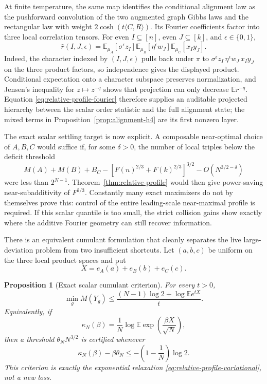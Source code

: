\documentclass[11pt]{article}
\newtheorem{proposition}[theorem]{Proposition}
\newcommand{\E}{\mathbb E}
\begin{document}
At finite temperature, the same map identifies the conditional alignment
law as the pushforward convolution of the two augmented graph Gibbs laws and
the rectangular law with weight $2\cosh(t\langle C,R\rangle)$.  Its Fourier
coefficients factor into three local correlation tensors.  For even
$I\subseteq[n]$, even $J\subseteq[k]$, and $\epsilon\in\{0,1\}$,
\begin{equation}
 \widehat r(I,J,\epsilon)
 =\E_{\mu_A}[\sigma^\epsilon z_I]
  \E_{\mu_B}[\eta^\epsilon w_J]
 \E_{\mu_C}[x_Iy_J].
 \label{eq:relative-profile-fourier}
\end{equation}
Indeed, the character indexed by $(I,J,\epsilon)$ pulls back under $\pi$ to
$\sigma^\epsilon z_I\,\eta^\epsilon w_J\,x_Iy_J$ on the three product
factors, so independence gives the displayed product.  Conditional
expectation onto a character subspace preserves normalization, and Jensen's
inequality for $z\mapsto z^{-q}$ shows that projection can only decrease
$\E r^{-q}$.  Equation
\eqref{eq:relative-profile-fourier} therefore supplies an auditable projected
hierarchy between the scalar order statistic and the full alignment state;
the mixed terms in Proposition~\ref{prop:alignment-h4} are its first nonzero
layer.

The exact scalar settling target is now explicit.  A composable near-optimal
choice of $A,B,C$ would suffice if, for some $\delta>0$, the number of local
triples below the deficit threshold
\[
 M(A)+M(B)+B_C-
 [F(n)^{2/3}+F(k)^{2/3}]^{3/2}
 -O(N^{3/2-\delta})
\]
were less than $2^{N-1}$.  Theorem~\ref{thm:relative-profile} would then give
power-saving near-subadditivity of $F^{2/3}$.  Constantly many exact
maximizers do not by themselves prove this: control of the entire
leading-scale near-maximal profile is required.  If this scalar quantile is
too small, the strict collision gains show exactly where the additive
Fourier geometry can still recover information.

There is an equivalent cumulant formulation that cleanly separates the live
large-deviation problem from two insufficient shortcuts.  Let $(a,b,c)$ be
uniform on the three local product spaces and put
\[
 X=e_A(a)+e_B(b)+e_C(c).
\]

\begin{proposition}[Exact scalar cumulant criterion]
\label{prop:profile-cgf}
For every $t>0$,
\begin{equation}
 \min_g M(Y_g)
 \le
 \frac{(N-1)\log2+\log\E e^{tX}}{t}.
 \label{eq:profile-cgf}
\end{equation}
Equivalently, if
\[
 \kappa_N(\beta)=\frac1N\log\E
 \exp\left(\frac{\beta X}{\sqrt N}\right),
\]
then a threshold $\theta_NN^{3/2}$ is certified whenever
\begin{equation}
 \kappa_N(\beta)-\beta\theta_N
 \le-\left(1-\frac1N\right)\log2.
 \label{eq:profile-cgf-mean-field}
\end{equation}
This criterion is exactly the exponential relaxation
\eqref{eq:relative-profile-variational}, not a new loss.
\end{proposition}
\end{document}
